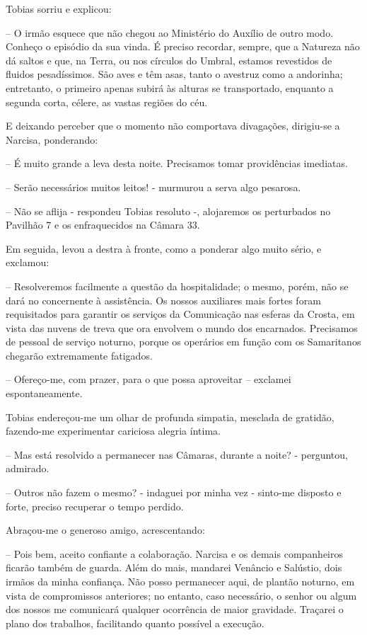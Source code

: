 \documentclass[portuguese,12pt,a4paper]{scrbook}
\begin{document}
	Tobias sorriu e explicou:
	
	
	– O irmão esquece que não chegou ao Ministério do Auxílio de outro modo. Conheço o episódio da sua vinda. É preciso recordar, sempre, que a Natureza não dá saltos e que, na Terra, ou nos círculos do Umbral, estamos revestidos de fluidos pesadíssimos. São aves e têm asas, tanto o avestruz como a andorinha; entretanto, o primeiro apenas subirá às alturas se transportado, enquanto a segunda corta, célere, as vastas regiões do céu.
	
	E deixando perceber que o momento não comportava divagações, dirigiu-se a Narcisa, ponderando:
	
	– É muito grande a leva desta noite. Precisamos tomar providências imediatas.
	
	– Serão necessários muitos leitos! - murmurou a serva algo pesarosa.
	
	– Não se aflija - respondeu Tobias resoluto -, alojaremos os perturbados no Pavilhão 7 e os enfraquecidos na Câmara 33.
	
	Em seguida, levou a destra à fronte, como a ponderar algo muito sério, e exclamou:
	
	– Resolveremos facilmente a questão da hospitalidade; o mesmo, porém, não se dará no concernente à assistência. Os nossos auxiliares mais fortes foram requisitados para garantir os serviços da Comunicação nas esferas da Crosta, em vista das nuvens de treva que ora envolvem o mundo dos encarnados. Precisamos de pessoal de serviço noturno, porque os operários em função com os Samaritanos chegarão extremamente fatigados.
	
	– Ofereço-me, com prazer, para o que possa aproveitar – exclamei espontaneamente.
	
	Tobias endereçou-me um olhar de profunda simpatia, mesclada de gratidão, fazendo-me experimentar cariciosa alegria íntima.
	
	
	– Mas está resolvido a permanecer nas Câmaras, durante a noite? - perguntou, admirado.
	
	– Outros não fazem o mesmo? - indaguei por minha vez - sinto-me disposto e forte, preciso recuperar o tempo perdido.
	
	Abraçou-me o generoso amigo, acrescentando:
	
	– Pois bem, aceito confiante a colaboração. Narcisa e os demais companheiros ficarão também de guarda. Além do mais, mandarei Venâncio e Salústio, dois irmãos da minha confiança. Não posso permanecer aqui, de plantão noturno, em vista de compromissos anteriores; no entanto, caso necessário, o senhor ou algum dos nossos me comunicará qualquer ocorrência de maior gravidade. Traçarei o plano dos trabalhos, facilitando quanto possível a execução.
	
\end{document}
